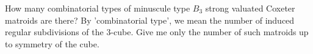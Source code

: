 How many combinatorial types of minuscule type $B_3$ strong valuated Coxeter matroids are there? By 'combinatorial type', we mean the number of induced regular subdivisions of the $3$-cube. Give me only the number of such matroids up to symmetry of the cube.
